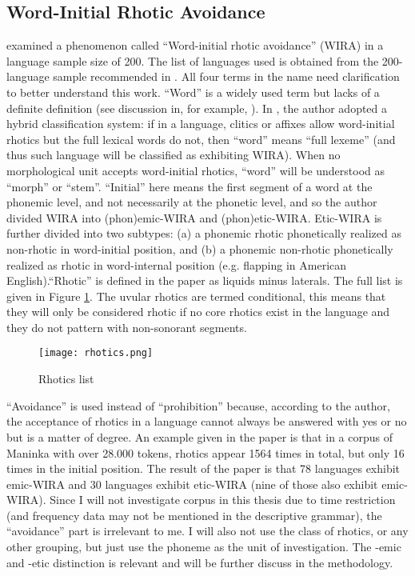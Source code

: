 \subsection{Word-Initial Rhotic Avoidance}

\citet{labrune2021word} examined a phenomenon called ``Word-initial rhotic avoidance'' (WIRA) in a language sample size of 200. The list of languages used is obtained from the 200-language sample recommended in \citet{wals}. All four terms in the name need clarification to better understand this work. ``Word'' is a widely used term but lacks of a definite definition (see discussion in, for example, \citet{martin2017indeterminacy}). In \citet{labrune2021word}, the author adopted a hybrid classification system: if in a language, clitics or affixes allow word-initial rhotics but the full lexical words do not, then ``word'' means ``full lexeme'' (and thus such language will be classified as exhibiting WIRA). When no morphological unit accepts word-initial rhotics, ``word'' will be understood as ``morph'' or ``stem''. ``Initial'' here means the first segment of a word at the phonemic level, and not necessarily at the phonetic level, and so the author divided  WIRA into (phon)emic-WIRA and (phon)etic-WIRA. Etic-WIRA is further divided into two subtypes: (a) a phonemic rhotic phonetically realized as non-rhotic in word-initial position, and (b) a phonemic non-rhotic phonetically realized as rhotic in word-internal position (e.g. flapping in American English).``Rhotic'' is defined in the paper as liquids minus laterals. The full list is given in Figure \ref{fig:rhotics}. The uvular rhotics are termed conditional, this means that they will only be considered rhotic if no core rhotics exist in the language and they do not pattern with non-sonorant segments.

\begin{figure}[h]
    \centering
    \texttt{[image: rhotics.png]}
    \caption{Rhotics list \citep[p.~4]{labrune2021word}}
    \label{fig:rhotics}
\end{figure}

``Avoidance'' is used instead of ``prohibition'' because, according to the author, the acceptance of rhotics in a language cannot always be answered with yes or no but is a matter of degree. An example given in the paper is that in a corpus of Maninka with over 28.000 tokens, rhotics appear 1564 times in total, but only 16 times in the initial position. The result of the paper is that 78 languages exhibit emic-WIRA and 30 languages exhibit etic-WIRA (nine of those also exhibit emic-WIRA). Since I will not investigate corpus in this thesis due to time restriction (and frequency data may not be mentioned in the descriptive grammar), the ``avoidance'' part is irrelevant to me. I will also not use the class of rhotics, or any other grouping, but just use the phoneme as the unit of investigation. The -emic and -etic distinction is relevant and will be further discuss in the methodology. 

